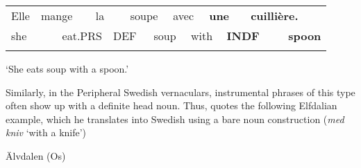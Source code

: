 \begin{tabular}{llllllllllllll}
\lsptoprule
Elle & \multicolumn{2}{l}{mange

} & \multicolumn{2}{l}{la

} & \multicolumn{2}{l}{soupe

} & \multicolumn{2}{l}{avec

} & \multicolumn{2}{l}{{\bfseries une}

} & \multicolumn{2}{l}{{\bfseries cuillière.}

} & \\
\multicolumn{2}{l}{she

} & \multicolumn{2}{l}{eat.PRS

} & \multicolumn{2}{l}{DEF

} & \multicolumn{2}{l}{soup

} & \multicolumn{2}{l}{with

} & \multicolumn{2}{l}{{\bfseries INDF}

} & \multicolumn{2}{l}{{\bfseries spoon}

}\\
\lspbottomrule
\end{tabular}

\begin{styleTranslation}
‘She eats soup with a spoon.’

\end{styleTranslation}

\begin{styleBodyTextFirst}
Similarly, in the Peripheral Swedish vernaculars, instrumental phrases of this type often show up with a definite head noun. Thus, \citet[126]{Levander1909} quotes the following Elfdalian example, which he translates into Swedish using a bare noun construction (\textit{med kniv} ‘with a knife’)

\end{styleBodyTextFirst}

\begin{listWWNumileveli}
\item {}

\begin{styleExample}
Älvdalen (Os)

\end{styleExample}

\end{listWWNumileveli}

